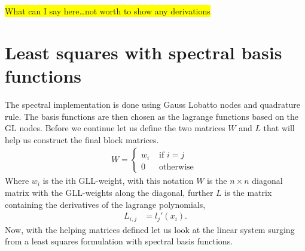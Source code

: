 \colorbox{yellow}{What can I say here\ldots not worth to show any derivations}
\section{Least squares with spectral basis functions}

The spectral implementation is done using Gauss Lobatto nodes and quadrature rule. The basis functions are then chosen as the lagrange functions based on the GL nodes. Before we continue let us define the two matrices $W$ and $L$ that will help us construct the final block matrices.
%
\begin{align}
	W = \left\{
		\begin{array}{lr}
			w_i & \text{ if } i = j \\
			0 & \text{ otherwise }
		\end{array}
		\right.
	\label{eq:Wdef}
\end{align}
%
Where $w_i$ is the ith GLL-weight, with this notation $W$ is the $n \times n$ diagonal matrix with the GLL-weights along the diagonal, further $L$ is the matrix containing the derivatives of the lagrange polynomials,  
%
\begin{align}
	L_{i,j} &= l_j'(x_i).
	\label{eq:HelpMatrices}
\end{align}
%
Now, with the helping matrices defined let us look at the linear system surging from a least squares formulation with spectral basis functions. 

